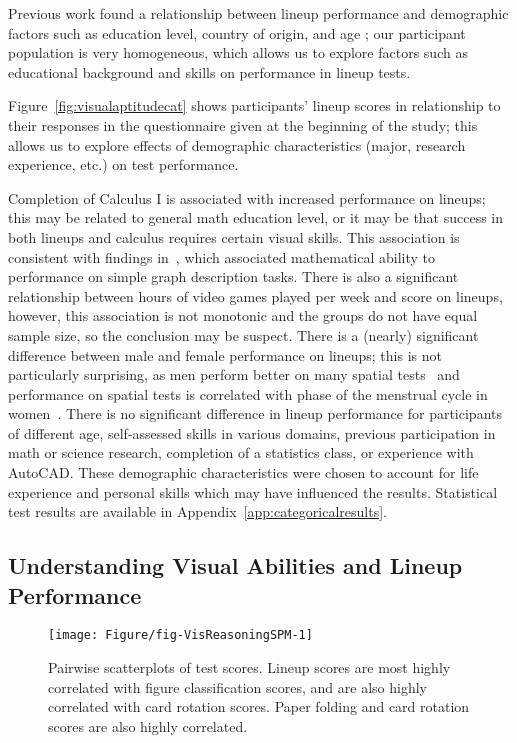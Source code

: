 \documentclass[journal]{vgtc}\usepackage[]{graphicx}\usepackage[]{color}
\begin{document}
Previous work found a relationship between lineup performance and demographic factors such as education level, country of origin, and age \cite{humanfactorslineups}; our participant population is very homogeneous, which allows us to explore factors such as educational background and skills on performance in lineup tests. 

Figure~\ref{fig:visualaptitudecat} shows participants' lineup scores in relationship to their responses in the questionnaire given at the beginning of the study; this allows us to explore effects of demographic characteristics (major, research experience, etc.) on test performance. 

Completion of Calculus I is associated with increased performance on lineups; this may be related to general math education level, or it may be that success in both lineups and calculus requires certain visual skills. This association is consistent with findings in~\cite{shah1995conceptual}, which associated  mathematical ability to performance on simple graph description tasks.  There is also a significant relationship between hours of video games played per week and score on lineups, however, this association is not monotonic and the groups do not have equal sample size, so the conclusion may be suspect. There is a (nearly) significant difference between male and female performance on lineups; this is not particularly surprising, as men perform better on many spatial tests~\cite{voyer1995magnitude} and performance on spatial tests is correlated with phase of the menstrual cycle in women~\cite{hausmann2000sex}. There is no significant difference in lineup performance for participants of different age, self-assessed skills in various domains, previous participation in math or science research, completion of a statistics class, or experience with AutoCAD. These demographic characteristics were chosen to account for life experience and personal skills which may have influenced the results. Statistical test results are available in Appendix~\ref{app:categoricalresults}. 

\subsection{Understanding Visual Abilities and Lineup Performance}



\begin{figure}[ht]
\texttt{[image: Figure/fig-VisReasoningSPM-1]}
\caption{Pairwise scatterplots of test scores. Lineup scores are most highly correlated with figure classification scores, and are also highly correlated with card rotation scores. Paper folding and card rotation scores are also highly correlated.\label{fig:scatterplotmatrix}}
\end{figure}
\afterpage{\clearpage}
\end{document}
